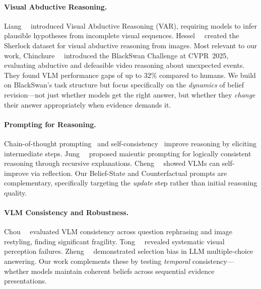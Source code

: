 \paragraph{Visual Abductive Reasoning.}
Liang~\etal~\cite{liang2022visual} introduced Visual Abductive Reasoning (VAR), requiring models to infer plausible hypotheses from incomplete visual sequences.  Hessel~\etal~\cite{hessel2022sherlock} created the Sherlock dataset for visual abductive reasoning from images.  Most relevant to our work, Chinchure~\etal~\cite{chinchure2025blackswan} introduced the BlackSwan Challenge at CVPR~2025, evaluating abductive and defeasible video reasoning about unexpected events.  They found VLM performance gaps of up to 32\% compared to humans.  We build on BlackSwan's task structure but focus specifically on the \emph{dynamics} of belief revision---not just whether models get the right answer, but whether they \emph{change} their answer appropriately when evidence demands it.

\paragraph{Prompting for Reasoning.}
Chain-of-thought prompting~\cite{wei2022chain} and self-consistency~\cite{wang2023selfconsistency} improve reasoning by eliciting intermediate steps.  Jung~\etal~\cite{jung2022maieutic} proposed maieutic prompting for logically consistent reasoning through recursive explanations.  Cheng~\etal~\cite{cheng2025reflection} showed VLMs can self-improve via reflection.  Our Belief-State and Counterfactual prompts are complementary, specifically targeting the \emph{update} step rather than initial reasoning quality.

\paragraph{VLM Consistency and Robustness.}
Chou~\etal~\cite{chou2025mmr3} evaluated VLM consistency across question rephrasing and image restyling, finding significant fragility.  Tong~\etal~\cite{tong2024eyeswideshut} revealed systematic visual perception failures.  Zheng~\etal~\cite{zheng2024robust} demonstrated selection bias in LLM multiple-choice answering.  Our work complements these by testing \emph{temporal} consistency---whether models maintain coherent beliefs across sequential evidence presentations.
